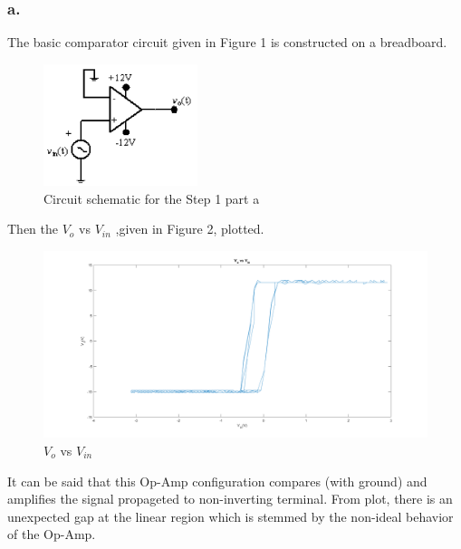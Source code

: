 \documentclass[letterpaper,12pt]{article}
\begin{document}
\subsubsection{a.}
The basic comparator circuit given in Figure 1 is constructed on a breadboard.
\begin{figure}[H]
	\centering
   \includegraphics[width=0.4\textwidth]{circuit1.png}
   \caption{Circuit schematic for the Step 1 part a}
\end{figure} 
Then the \(V_{o} \) vs \( V_{in}\) ,given in Figure 2, plotted.
\begin{figure}[H]
	\centering
   \includegraphics[width=1\textwidth]{e_1_a.png}
   \caption{\(V_{o} \) vs \( V_{in}\)}
\end{figure} 
It can be said that this Op-Amp configuration compares (with ground) and amplifies the signal propageted to non-inverting terminal. From plot, there is an unexpected gap at the linear region which is stemmed by the non-ideal behavior of the Op-Amp. 
\end{document}

